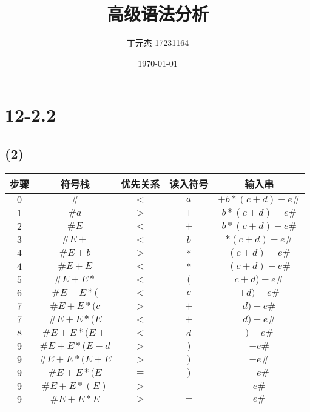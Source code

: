 \documentclass[UTF8]{ctexart}
\title{高级语法分析}
\author{丁元杰 17231164}
\date{\today}
\begin{document}
\maketitle


\section*{12-2.2}

    \subsection*{(2)}
        \begin{tabular}{|c|c|c|c|c|}
            \hline
            步骤 & 符号栈 & 优先关系 & 读入符号 & 输入串 \\
            \hline
            $0$ & $\#$ & $<$ & $a$ & $+b*(c+d)-e\#$ \\
            \hline
            $1$ & $\#a$ & $>$ & $+$ & $b*(c+d)-e\#$ \\
            \hline
            $2$ & $\#E$ & $<$ & $+$ & $b*(c+d)-e\#$ \\
            \hline
            $3$ & $\#E+$ & $<$ & $b$ & $*(c+d)-e\#$ \\
            \hline
            $4$ & $\#E+b$ & $>$ & $*$ & $(c+d)-e\#$ \\
            \hline
            $4$ & $\#E+E$ & $<$ & $*$ & $(c+d)-e\#$ \\
            \hline
            $5$ & $\#E+E*$ & $<$ & $($ & $c+d)-e\#$ \\
            \hline
            $6$ & $\#E+E*($ & $<$ & $c$ & $+d)-e\#$ \\
            \hline
            $7$ & $\#E+E*(c$ & $>$ & $+$ & $d)-e\#$ \\
            \hline
            $7$ & $\#E+E*(E$ & $<$ & $+$ & $d)-e\#$ \\
            \hline
            $8$ & $\#E+E*(E+$ & $<$ & $d$ & $)-e\#$ \\
            \hline
            $9$ & $\#E+E*(E+d$ & $>$ & $)$ & $-e\#$ \\
            \hline
            $9$ & $\#E+E*(E+E$ & $>$ & $)$ & $-e\#$ \\
            \hline
            $9$ & $\#E+E*(E$ & $=$ & $)$ & $-e\#$ \\
            \hline
            $9$ & $\#E+E*(E)$ & $>$ & $-$ & $e\#$ \\
            \hline
            $9$ & $\#E+E*E$ & $>$ & $-$ & $e\#$ \\

\end{tabular}
\end{document}
